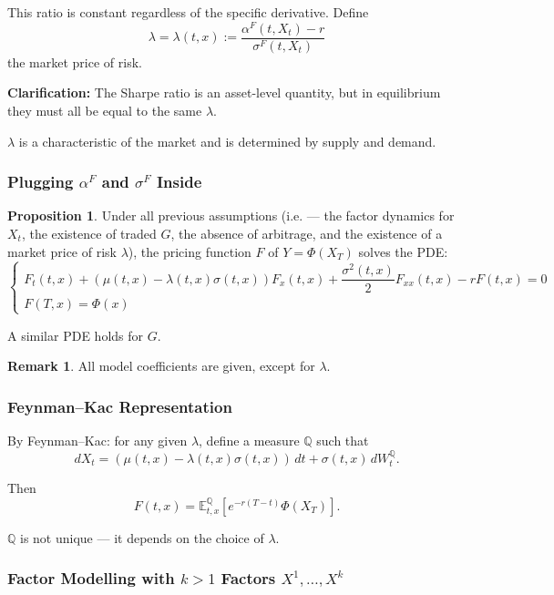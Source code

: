 \documentclass[12pt,a4paper]{article}
\theoremstyle{definition}
\newtheorem{proposition}{Proposition}[section]
\newtheorem{remark}{Remark}[section]
\newcommand{\E}{\mathbb{E}}
\begin{document}
This ratio is constant regardless of the specific derivative. Define
\[
\lambda = \lambda(t, x) := \frac{\alpha^F(t, X_t) - r}{\sigma^F(t, X_t)}
\]
the market price of risk.

\textbf{Clarification:} The Sharpe ratio is an asset-level quantity, but in equilibrium they must all be equal to the same $\lambda$.

$\lambda$ is a characteristic of the market and is determined by supply and demand.

\subsubsection{Plugging $\alpha^F$ and $\sigma^F$ Inside}

\begin{proposition}
Under all previous assumptions (i.e. — the factor dynamics for $X_t$, the existence of traded $G$, the absence of arbitrage, and the existence of a market price of risk $\lambda$), the pricing function $F$ of $Y = \Phi(X_T)$ solves the PDE:
\[
\begin{cases}
F_t(t, x) + (\mu(t, x) - \lambda(t, x)\sigma(t, x))F_x(t, x) + \dfrac{\sigma^2(t, x)}{2} F_{xx}(t, x) - r F(t, x) = 0 \\[0.5em]
F(T, x) = \Phi(x)
\end{cases}
\]
\end{proposition}

A similar PDE holds for $G$.

\begin{remark}
All model coefficients are given, except for $\lambda$.
\end{remark}

\subsubsection{Feynman--Kac Representation}

By Feynman--Kac: for any given $\lambda$, define a measure $\mathbb{Q}$ such that
\[
dX_t = (\mu(t, x) - \lambda(t, x)\sigma(t, x)) \, dt + \sigma(t, x) \, dW_t^\mathbb{Q}.
\]

Then
\[
F(t, x) = \E_{t,x}^\mathbb{Q}\left[e^{-r(T-t)} \Phi(X_T)\right].
\]

$\mathbb{Q}$ is not unique — it depends on the choice of $\lambda$.

\subsubsection{Factor Modelling with $k > 1$ Factors $X^1, \ldots, X^k$}
\end{document}
